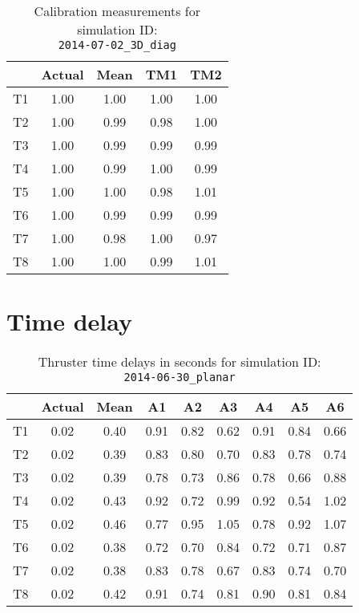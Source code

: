 \begin{table}[H]
\centering
\cprotect\caption{Calibration measurements for simulation ID:\\
\verb|2014-07-02_3D_diag|}
\begin{tabular}{|c|c|c|c|c|} \hline
~ & Actual & Mean & TM1 & TM2 \\ \hline
T1 & 1.00 & 1.00 & 1.00 & 1.00 \\
T2 & 1.00 & 0.99 & 0.98 & 1.00 \\
T3 & 1.00 & 0.99 & 0.99 & 0.99 \\
T4 & 1.00 & 0.99 & 1.00 & 0.99 \\
T5 & 1.00 & 1.00 & 0.98 & 1.01 \\
T6 & 1.00 & 0.99 & 0.99 & 0.99 \\
T7 & 1.00 & 0.98 & 1.00 & 0.97 \\
T8 & 1.00 & 1.00 & 0.99 & 1.01 \\ \hline
\end{tabular}
\label{calib-6}
\end{table}
\newpage
\section*{Time delay}


\begin{table}[H]
\centering
\cprotect\caption{Thruster time delays in seconds for simulation ID:\\
\verb|2014-06-30_planar|}
\begin{tabular}{|c|c|c|c|c|c|c|c|c|} \hline
~ & Actual & Mean & A1 & A2 & A3 & A4 & A5 & A6 \\ \hline
T1 & 0.02 & 0.40 & 0.91 & 0.82 & 0.62 & 0.91 & 0.84 & 0.66 \\
T2 & 0.02 & 0.39 & 0.83 & 0.80 & 0.70 & 0.83 & 0.78 & 0.74 \\
T3 & 0.02 & 0.39 & 0.78 & 0.73 & 0.86 & 0.78 & 0.66 & 0.88 \\
T4 & 0.02 & 0.43 & 0.92 & 0.72 & 0.99 & 0.92 & 0.54 & 1.02 \\
T5 & 0.02 & 0.46 & 0.77 & 0.95 & 1.05 & 0.78 & 0.92 & 1.07 \\
T6 & 0.02 & 0.38 & 0.72 & 0.70 & 0.84 & 0.72 & 0.71 & 0.87 \\
T7 & 0.02 & 0.38 & 0.83 & 0.78 & 0.67 & 0.83 & 0.74 & 0.70 \\
T8 & 0.02 & 0.42 & 0.91 & 0.74 & 0.81 & 0.90 & 0.81 & 0.84 \\ \hline
\end{tabular}
\label{delay-1}
\end{table}

